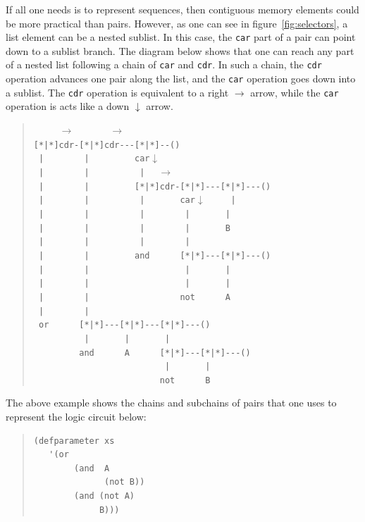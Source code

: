 \documentclass[a4paper,12pt]{book}
\newenvironment{fmpage}[1]
           {\begin{lrbox}{\fmbox}\begin{minipage}{#1}}
           {\end{minipage}\end{lrbox}\fbox{\usebox{\fmbox}}}
\begin{document}
\begin{fmpage}{0.8\linewidth}
\verb||
\end{fmpage}

\pagebreak
If all one needs is to represent
sequences, then contiguous memory
elements could be more
practical than pairs. However, as one
can see in figure~\ref{fig:selectors},
a list element can be a nested sublist.
In this case, 
the \verb|car| part of a pair can point down to
a sublist branch. The diagram below shows
that one can reach any part of a nested
list following a chain of \verb|car| and \verb|cdr|.
In such a chain, the \verb|cdr| operation
advances one pair along the list, and
the \verb|car| operation goes down into a sublist.
The \verb|cdr| operation is equivalent to a
right $\rightarrow$  arrow, while the \verb|car|
operation is acts like a down $\downarrow$ arrow.
\begin{quote}
\verb"     "$\rightarrow$\verb"       "$\rightarrow$\\
\verb"[*|*]cdr-[*|*]cdr---[*|*]--()"\\
\verb" |        |         car"$\downarrow$\\
\verb" |        |          |  " $\rightarrow$\\
\verb" |        |         [*|*]cdr-[*|*]---[*|*]---()"\\
\verb" |        |          |       car"$\downarrow$\verb"     |"\\
\verb" |        |          |        |       |"\\
\verb" |        |          |        |       B"\\
\verb" |        |          |        |  "\\
\verb" |        |         and      [*|*]---[*|*]---()"\\
\verb" |        |                   |       |"\\
\verb" |        |                   |       |"\\
\verb" |        |                  not      A"\\
\verb" |        |"\\
\verb" or      [*|*]---[*|*]---[*|*]---()"\\          
\verb"          |       |       |"\\                     
\verb"         and      A      [*|*]---[*|*]---()"\\  
\verb"                          |       |"\\                     
\verb"                         not      B"                    
\end{quote}
The above example shows the chains and subchains of
pairs that one uses to represent the logic
circuit below:
\begin{quote}
\begin{verbatim}
(defparameter xs
   '(or 
        (and  A  
              (not B))
        (and (not A)
             B)))
\end{verbatim}
\end{quote}
\end{document}
